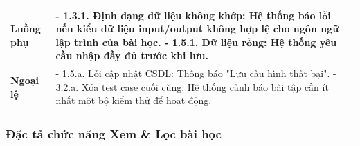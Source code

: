 \documentclass[../main.tex]{subfiles}
\begin{document}
{\begin{tabularx}{\textwidth}{|p{3.5cm}|>{\raggedright\arraybackslash}X|}
\hline
\textbf{Luồng phụ} & - 1.3.1. Định dạng dữ liệu không khớp: Hệ thống báo lỗi nếu kiểu dữ liệu input/output không hợp lệ cho ngôn ngữ lập trình của bài học. \newline - 1.5.1. Dữ liệu rỗng: Hệ thống yêu cầu nhập đầy đủ trước khi lưu. \\
\hline
\textbf{Ngoại lệ} & - 1.5.a. Lỗi cập nhật CSDL: Thông báo "Lưu cấu hình thất bại". \newline - 3.2.a. Xóa test case cuối cùng: Hệ thống cảnh báo bài tập cần ít nhất một bộ kiểm thử để hoạt động. \\
\hline
\end{tabularx}
}

\subsubsection{Đặc tả chức năng Xem \& Lọc bài học}
\end{document}
